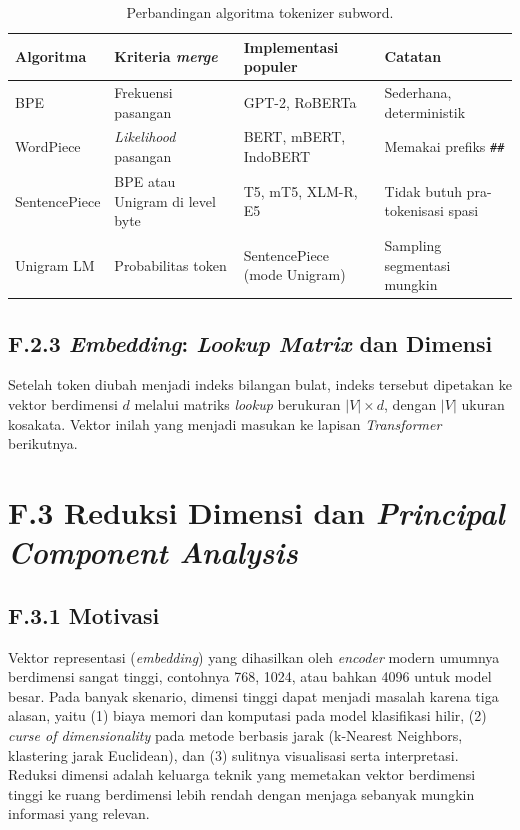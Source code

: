 \begin{table}[htbp]
\centering
\caption{Perbandingan algoritma tokenizer subword.}
\label{tab:tokenizer}
\setlength{\tabcolsep}{4pt}
\begin{tabular}{p{2.4cm} p{3.7cm} p{3.6cm} p{2.6cm}}
\toprule
\textbf{Algoritma} & \textbf{Kriteria \textit{merge}} & \textbf{Implementasi populer} & \textbf{Catatan} \\
\midrule
BPE & Frekuensi pasangan & GPT-2, RoBERTa & Sederhana, deterministik \\
WordPiece & \textit{Likelihood} pasangan & BERT, mBERT, IndoBERT & Memakai prefiks \texttt{\#\#} \\
SentencePiece & BPE atau Unigram di level byte & T5, mT5, XLM-R, E5 & Tidak butuh pra-tokenisasi spasi \\
Unigram LM & Probabilitas token & SentencePiece (mode Unigram) & Sampling segmentasi mungkin \\
\bottomrule
\end{tabular}
\end{table}

\subsection*{F.2.3 \textit{Embedding}: \textit{Lookup Matrix} dan Dimensi}

Setelah token diubah menjadi indeks bilangan bulat, indeks tersebut dipetakan ke vektor berdimensi $d$ melalui matriks \textit{lookup} berukuran $|V| \times d$, dengan $|V|$ ukuran kosakata. Vektor inilah yang menjadi masukan ke lapisan \textit{Transformer} berikutnya.

\section*{F.3 Reduksi Dimensi dan \textit{Principal Component Analysis}}
\label{app:pca-detail}

\subsection*{F.3.1 Motivasi}

Vektor representasi (\textit{embedding}) yang dihasilkan oleh \textit{encoder} modern umumnya berdimensi sangat tinggi, contohnya 768, 1024, atau bahkan 4096 untuk model besar. Pada banyak skenario, dimensi tinggi dapat menjadi masalah karena tiga alasan, yaitu (1) biaya memori dan komputasi pada model klasifikasi hilir, (2) \textit{curse of dimensionality} pada metode berbasis jarak (k-Nearest Neighbors, klastering jarak Euclidean), dan (3) sulitnya visualisasi serta interpretasi. Reduksi dimensi adalah keluarga teknik yang memetakan vektor berdimensi tinggi ke ruang berdimensi lebih rendah dengan menjaga sebanyak mungkin informasi yang relevan.

